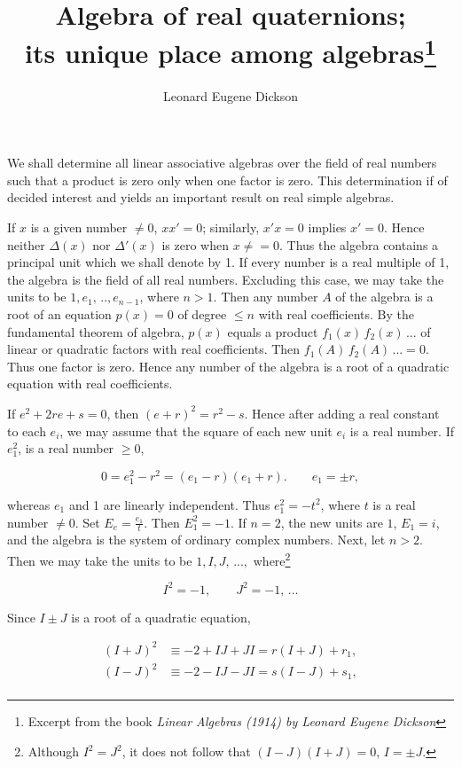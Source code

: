 \documentclass{article}
\author{Leonard Eugene Dickson}
\date{}
\title{Algebra of real quaternions;\\its unique place among algebras\footnote{Excerpt from the book \textit{Linear Algebras (1914) by Leonard Eugene Dickson}}}
\begin{document}
\maketitle

We shall determine all linear associative algebras over the field of real numbers such that a product is zero only when one factor is zero. This determination if of decided interest and yields an important result on real simple algebras.

If $x$ is a given number $\neq 0$, $xx' = 0$;  similarly, $x'x = 0$ implies $x' = 0$. Hence neither $\Delta(x)$ nor $\Delta'(x)$ is zero when $x\neq = 0$. Thus the algebra contains a principal unit which we shall denote by 1. If every number is a real multiple of 1, the algebra is the field of all real numbers. Excluding this case, we may take the units to be $1, e_{1},\,..,e_{n-1}$, where $n>1$. Then any number $A$ of the algebra is a root of an equation $p(x) = 0$ of degree $\leq n$ with real coefficients. By the fundamental theorem of algebra, $p(x)$ equals a product $f_{1}(x)\,f_{2}(x)\,...$ of linear or quadratic factors with real coefficients. Then $f_{1}(A)\,f_{2}(A)\,...=0$. Thus one factor is zero. Hence any number of the algebra is a root of a quadratic equation with real coefficients.

If $e^{2}+2re+s=0$, then $(e+r)^{2}=r^{2}-s$. Hence after adding a real constant to each $e_{i}$, we may assume that the square of each new unit $e_{i}$ is a real number. If $e^{2}_{1}$, is a real number $\geq 0$,

$$
0 = e_{1}^{2}-r^{2}=(e_{1}-r)(e_{1}+r).\quad\quad e_{1}=\pm r,
$$

whereas $e_{1}$ and 1 are linearly independent. Thus $e_{1}^{2}=-t^{2}$, where $t$ is a real number $\neq 0$. Set $E_{e} = \frac{e_{1}}{t}$. Then $E_{1}^{2} = -1$. If $n=2$, the new units are $1$, $E_{1}=i$, and the algebra is the system of ordinary complex numbers. Next, let $n>2$. Then we may take the units to be $1,I,J,\,...,$ where\footnote{Although $I^{2}=J^{2}$, it does not follow that $(I-J)(I+J)=0,\,I=\pm J$.} 

\begin{equation}
  \label{eqn_complex_squares}
  I^{2}=-1,\quad\quad J^{2}=-1,\,...
\end{equation}

Since $I\pm J$ is a root of a quadratic equation,

\begin{equation*}
  \begin{split}
    (I+J)^{2}&\equiv -2+IJ+JI=r(I+J)+r_{1}, \\
    (I-J)^{2}&\equiv -2-IJ-JI=s(I-J)+s_{1}, \\
  \end{split}
\end{equation*}
\end{document}

